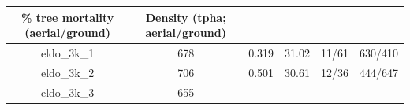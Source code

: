 \documentclass[]{article}
\begin{document}
\begin{longtable}[]{@{}cccccc@{}}
\begin{minipage}[b]{0.18\columnwidth}
\% tree mortality (aerial/ground)\strut
\end{minipage} & \begin{minipage}[b]{0.22\columnwidth}\centering\strut
Density (tpha; aerial/ground)\strut
\end{minipage}\tabularnewline
\midrule
\endhead
\begin{minipage}[t]{0.11\columnwidth}\centering\strut
eldo\_3k\_1\strut
\end{minipage} & \begin{minipage}[t]{0.07\columnwidth}\centering\strut
678\strut
\end{minipage} & \begin{minipage}[t]{0.11\columnwidth}\centering\strut
0.319\strut
\end{minipage} & \begin{minipage}[t]{0.13\columnwidth}\centering\strut
31.02\strut
\end{minipage} & \begin{minipage}[t]{0.18\columnwidth}\centering\strut
11/61\strut
\end{minipage} & \begin{minipage}[t]{0.22\columnwidth}\centering\strut
630/410\strut
\end{minipage}\tabularnewline
\begin{minipage}[t]{0.11\columnwidth}\centering\strut
eldo\_3k\_2\strut
\end{minipage} & \begin{minipage}[t]{0.07\columnwidth}\centering\strut
706\strut
\end{minipage} & \begin{minipage}[t]{0.11\columnwidth}\centering\strut
0.501\strut
\end{minipage} & \begin{minipage}[t]{0.13\columnwidth}\centering\strut
30.61\strut
\end{minipage} & \begin{minipage}[t]{0.18\columnwidth}\centering\strut
12/36\strut
\end{minipage} & \begin{minipage}[t]{0.22\columnwidth}\centering\strut
444/647\strut
\end{minipage}\tabularnewline
\begin{minipage}[t]{0.11\columnwidth}\centering\strut
eldo\_3k\_3\strut
\end{minipage} & \begin{minipage}[t]{0.07\columnwidth}\centering\strut
655\strut
\end{minipage} & \begin{minipage}[t]{0.11\columnwidth}\centering\strut

\end{minipage}
\end{longtable}
\end{document}
